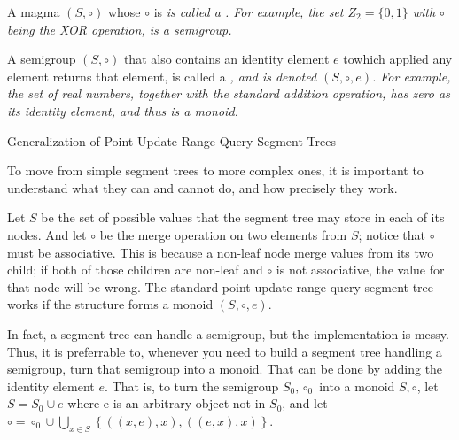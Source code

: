 
A magma $(S, \circ)$ whose $\circ$ is \it {} \rm is called a \it {} \rm.  For example, the set $Z_2 = \{0, 1\}$ with $\circ$ being the XOR operation, is a semigroup.


A semigroup $(S, \circ)$ that also contains an identity element $e$ towhich applied any element returns that element, is called a \it {} \rm, and is denoted $(S, \circ, e)$.  For example, the set of real numbers, together with the standard addition operation, has zero as its identity element, and thus is a monoid.



\secc Generalization of Point-Update-Range-Query  Segment Trees

To move from simple segment trees to more complex ones, it is important to understand what they can and cannot do, and how precisely they work.


Let $S$ be the set of possible values that the segment tree may store in each of its nodes.
And let $\circ$ be the merge operation on two elements from $S$; notice that $\circ$ must be associative.  This is because a non-leaf node merge values from its two child; if both of those children are non-leaf and $\circ$ is not associative, the value for that node will be wrong.
The standard point-update-range-query segment tree works if the structure forms a monoid $(S, \circ, e)$.

In fact, a segment tree can handle a semigroup, but the implementation is messy.  Thus, it is preferrable to, whenever you need to build a segment tree handling a semigroup, turn that semigroup into a monoid.  That can be done by adding the identity element $e$.  That is, to turn the semigroup $S_0, \circ_0$ into a monoid $S, \circ$, let $S = S_0 \cup {e}$ where e is an arbitrary object not in $S_0$, and let $\circ = \circ_0 \cup \bigcup_{x \in S} \left\{ \left(\left(x, e\right), x\right), \left(\left(e, x\right), x\right) \right\}$.


